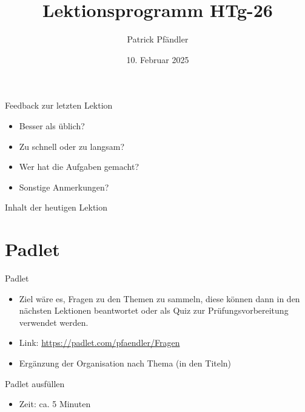 



\title{\textbf{Lektionsprogramm HTg-26}}
\author{Patrick Pfändler}
\date{10. Februar   2025}




\frame{\titlepage}


\folieFragen

\begin{frame}{Feedback zur letzten Lektion}
    \begin{itemize}
        \item[\textbullet] Besser als üblich?
        \item[\textbullet] Zu schnell oder zu langsam? 
        \item[\textbullet] Wer hat die Aufgaben gemacht?
        \item[\textbullet] Sonstige Anmerkungen? 
    \end{itemize}

\end{frame}


\begin{frame}{Inhalt der heutigen Lektion}
    \tableofcontents
\end{frame}


\section{Padlet}
\BlueSectionSlide
\begin{frame}{Padlet}
    \begin{itemize}
        \item[\textbullet] Ziel wäre es, Fragen zu den Themen zu sammeln, diese können dann in den nächsten Lektionen beantwortet oder als Quiz zur Prüfungsvorbereitung verwendet werden.
        \item[\textbullet] Link: \url{https://padlet.com/pfaendler/Fragen}
        \item[\textbullet] Ergänzung der Organisation nach Thema (in den Titeln)
    \end{itemize}
\end{frame}


\begin{frame}{Padlet ausfüllen}

    \begin{itemize}
        \item Zeit: ca. 5 Minuten
    \end{itemize}

\end{frame}


